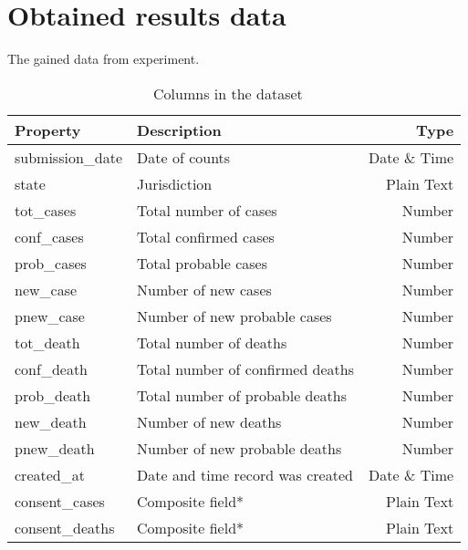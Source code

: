 
\appendix

\section*{Obtained results data}

The gained data from experiment.

\begin{table}[h]
        \centering
        \begin{tabular}{l|l|r}
        \toprule
        Property                & Description                           & Type \\\midrule
        submission\_date        & Date of counts                        & Date \& Time \\
        state                   & Jurisdiction                          &  Plain Text \\
        tot\_cases              & Total number of cases                 &  Number  \\
        conf\_cases             & Total confirmed cases                 &  Number  \\
        prob\_cases             & Total probable cases                  &  Number  \\
        new\_case               & Number of new cases                   &  Number  \\
        pnew\_case              & Number of new probable cases          &  Number  \\
        tot\_death              & Total number of deaths                &  Number  \\
        conf\_death             & Total number of confirmed deaths      &  Number  \\
        prob\_death             & Total number of probable deaths       &  Number  \\
        new\_death              & Number of new deaths                  &  Number  \\
        pnew\_death             & Number of new probable deaths         &  Number  \\
        created\_at             & Date and time record was created      &   Date \& Time  \\
        consent\_cases          & Composite field*                      &  Plain Text  \\
        consent\_deaths         & Composite field*                      &  Plain Text  \\
        \bottomrule
        \end{tabular}
        \caption{Columns in the dataset ~\cite{cdc-dataset}}
        \label{tab:list_of_raw_properties}
\end{table}



